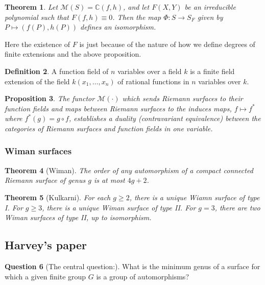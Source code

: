 \documentclass[reqno]{amsart}
\newtheorem{theorem}{Theorem}[section]
\newtheorem{proposition}[theorem]{Proposition}
\theoremstyle{definition}
\newtheorem{definition}[theorem]{Definition}
\newtheorem{question}[theorem]{Question}
\theoremstyle{remark}
\begin{document}
\begin{theorem}
    Let $\mathcal{M}(S) = \mathbb{C}(f,h)$, and
    let $F (X,Y)$ be
    an irreducible polynomial such that $F(f,h) 
    \equiv 0$. Then
    the map $\Phi \colon S \to S_F$ given by
    $P \mapsto (f(P),
    h(P))$ defines an isomorphism.
\end{theorem}

Here the existence of
$F$ is just because
of the nature of
how we define degrees
of finite extensions
and the above
proposition.

\begin{definition}
    A function field of $n$ variables over a field $k$ is a finite field extension of the field $k(x_1, \ldots, x_n)$ of rational functions in $n$ variables over $k$.
\end{definition}

\begin{proposition}
    The functor
    $\mathcal{M}(\cdot)$ which sends Riemann surfaces to their
    function fields
    and maps between Riemann surfaces to
    the induces maps,
    $f \mapsto f^*$ where $f^*(g) = 
    g \circ f$,
    establishes a duality (contravariant equivalence) between the categories of
    Riemann surfaces and function fields in one variable.
\end{proposition}

\subsubsection{Wiman surfaces}
\begin{theorem}[Wiman]
    The order of any automorphism of a compact
    connected Riemann surface of genus $g$ is at
    most $4g+2$.
\end{theorem}

\begin{theorem}[Kulkarni]
    For each $g \geq 2$, there is a unique
    Wiamn surface of type I. For $g \geq 3$, there is a unique Wiman surface of type II.
    For $g = 3$, there are two Wiman surfaces of type II, up to isomorphism.
\end{theorem}

\subsection{Harvey's paper}

\begin{question}[The central question:]
    What is the minimum genus of a surface for which a given finite
    group $G$ is a group of automorphisms?
\end{question}
\end{document}

